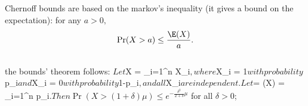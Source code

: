 \documentclass[10pt]{article}
\begin{document}
Chernoff bounds are based on the markov's inequality (it gives a bound on the expectation): for any $a > 0,$
$$
\Pr(X > a) \leq \frac{\E(X)}{a}.
$$\\ the bounds' theorem follows: $
    Let $X = \sum_{i=1}^n X_i$, where $X_i = 1$ with probability $p_i$ and $X_i = 0$ with probability $1-p_i$, and all $X_i$ are independent.
    Let $\mu = \E(X) = \sum_{i=1}^n p_i.$ Then
	\Pr(X > (1 + \delta)\mu) \leq  e^{-\frac{\delta^2}{2 + \delta} \mu}$ for all $\delta > 0$;
\end{document}
